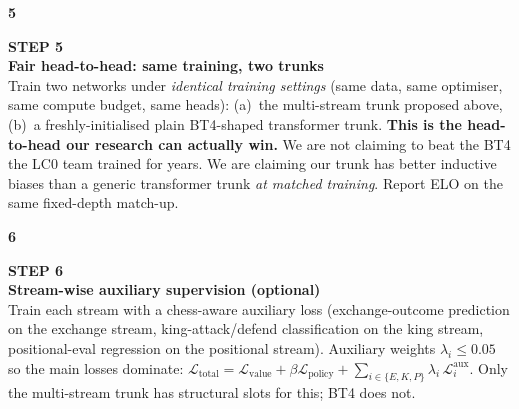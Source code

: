 \documentclass[10pt,a4paper]{article}
\begin{document}
\vspace{2pt}{\color{linecolor}\rule{\linewidth}{0.3pt}}\vspace{2pt}\par
\begin{minipage}{\linewidth}
\begin{minipage}[t]{0.06\linewidth}
\selectfont\LARGE\bfseries\color{forest}5
\end{minipage}\hfill
\begin{minipage}[t]{0.93\linewidth}
\textcolor{muted}{\scriptsize\sffamily\bfseries STEP 5}\\[0pt]
\textcolor{deepforest}{\sffamily\normalsize\bfseries Fair head-to-head: same training, two trunks}\\[2pt]
Train two networks under \emph{identical training settings} (same data, same optimiser, same compute budget, same heads): (a)~the multi-stream trunk proposed above, (b)~a freshly-initialised plain BT4-shaped transformer trunk. \textbf{This is the head-to-head our research can actually win.} We are not claiming to beat the BT4 the LC0 team trained for years. We are claiming our trunk has better inductive biases than a generic transformer trunk \emph{at matched training}. Report ELO on the same fixed-depth match-up.
\end{minipage}
\end{minipage}\par
\vspace{2pt}{\color{linecolor}\rule{\linewidth}{0.3pt}}\vspace{2pt}\par
\begin{minipage}{\linewidth}
\begin{minipage}[t]{0.06\linewidth}
\selectfont\LARGE\bfseries\color{forest}6
\end{minipage}\hfill
\begin{minipage}[t]{0.93\linewidth}
\textcolor{muted}{\scriptsize\sffamily\bfseries STEP 6}\\[0pt]
\textcolor{deepforest}{\sffamily\normalsize\bfseries Stream-wise auxiliary supervision (optional)}\\[2pt]
Train each stream with a chess-aware auxiliary loss (exchange-outcome prediction on the exchange stream, king-attack/defend classification on the king stream, positional-eval regression on the positional stream). Auxiliary weights $\lambda_i \leq 0.05$ so the main losses dominate: $\mathcal{L}_{\text{total}} = \mathcal{L}_{\text{value}} + \beta\mathcal{L}_{\text{policy}} + \sum_{i \in \{E,K,P\}} \lambda_i\,\mathcal{L}_i^{\text{aux}}$. Only the multi-stream trunk has structural slots for this; BT4 does not.
\end{minipage}
\end{minipage}\par
\end{document}
